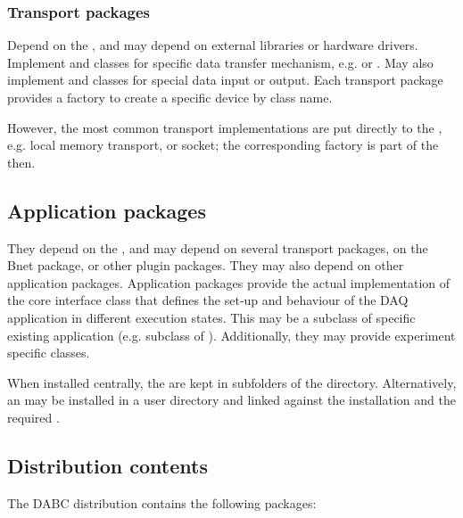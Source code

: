 \subsubsection{Transport packages}
   Depend on the , and may depend on external libraries or hardware drivers. 
   Implement  and 
    classes for specific data transfer mechanism, e.g. 
    or . May also implement  
   and  classes for special data input or output. Each transport package provides a 
   factory to create a specific device by class name. 
   
   However, the most common transport implementations are put 
   directly to the , e.g. local memory transport, or 
   socket; the corresponding factory is part of the  then. 
 
\subsection{Application packages}
They depend on the , and may depend 
on several transport packages, on the Bnet package, or other plugin packages. 
They may also depend on other application packages. 
Application packages provide the actual implementation of the core interface class
 that defines the set-up and behaviour of the DAQ application in 
different execution states. This may be a subclass of specific existing 
application (e.g. subclass of ). 
Additionally, they may provide experiment specific  classes.

When installed centrally, the  are kept in subfolders of the  
 directory. Alternatively, an  may be installed in a user directory and linked against the  installation and the required .


     
\subsection{Distribution contents}
The DABC distribution contains the following packages:

